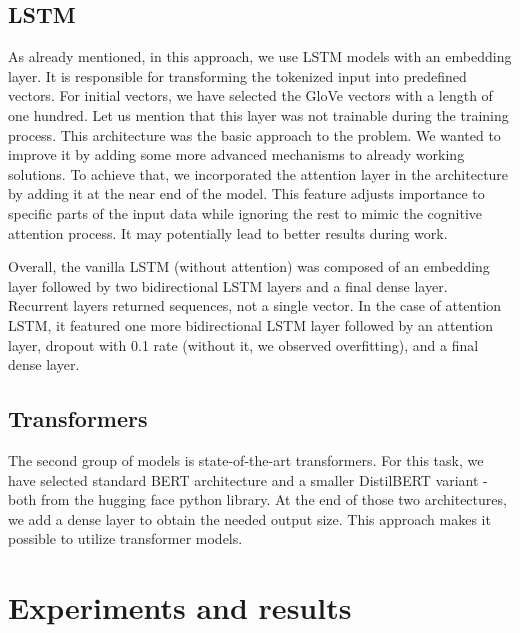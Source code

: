 \documentclass[11pt]{article}
\begin{document}
\subsection*{LSTM}
As already mentioned, in this approach, we use LSTM models with an embedding layer. It is responsible for transforming the tokenized input into predefined vectors. For initial vectors, we have selected the GloVe vectors with a length of one hundred. Let us mention that this layer was not trainable during the training process. This architecture was the basic approach to the problem. We wanted to improve it by adding some more advanced mechanisms to already working solutions. To achieve that, we incorporated the attention layer in the architecture by adding it at the near end of the model. This feature adjusts importance to specific parts of the input data while ignoring the rest to mimic the cognitive attention process. It may potentially lead to better results during work.

Overall, the vanilla LSTM (without attention) was composed of an embedding layer followed by two bidirectional LSTM layers and a final dense layer. Recurrent layers returned sequences, not a single vector. In the case of attention LSTM, it featured one more bidirectional LSTM layer followed by an attention layer, dropout with 0.1 rate (without it, we observed overfitting), and a final dense layer.


\subsection*{Transformers}

The second group of models is state-of-the-art transformers. For this task, we have selected standard BERT architecture and a smaller DistilBERT variant - both from the hugging face python library. At the end of those two architectures, we add a dense layer to obtain the needed output size. This approach makes it possible to utilize transformer models.





\section{Experiments and results} \label{experiments}
\end{document}
